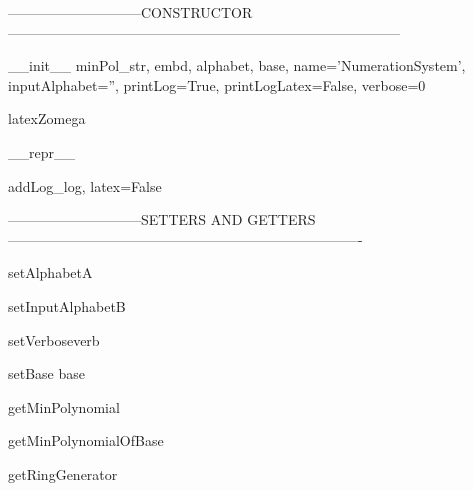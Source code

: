 -----------------------------CONSTRUCTOR------------------------------------------------------------------------------------

\begin{method}{\_\_init\_\_}{ minPol\_str, embd, alphabet, base, name='NumerationSystem', inputAlphabet='', printLog=True, printLogLatex=False, verbose=0}

\end{method}


\begin{method}{latexZomega}{}

\end{method}


\begin{method}{\_\_repr\_\_}{}

\end{method}


\begin{method}{addLog}{\_log, latex=False}

\end{method}


-----------------------------SETTERS AND GETTERS----------------------------------------------------------------------------

\begin{method}{setAlphabet}{A}

\end{method}


\begin{method}{setInputAlphabet}{B}

\end{method}


\begin{method}{setVerbose}{verb}

\end{method}


\begin{method}{setBase}{ base}

\end{method}


\begin{method}{getMinPolynomial}{}

\end{method}


\begin{method}{getMinPolynomialOfBase}{}

\end{method}


\begin{method}{getRingGenerator}{}

\end{method}


